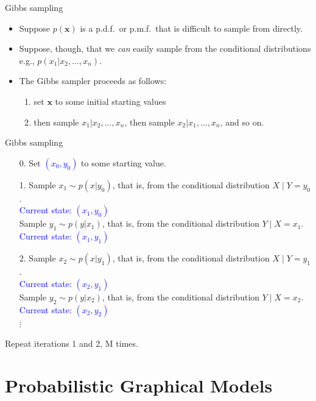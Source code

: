 \documentclass{beamer}					%
\begin{document}
\begin{frame}{Gibbs sampling}

\begin{itemize}
\item Suppose $p(\mathbf{x})$ is a p.d.f.\ or p.m.f.\ that is difficult to sample from directly.  
\item Suppose, though, that we \textit{can} easily sample from the conditional distributions e.g., $p(x_{1}|x_{2},...,x_{n})$. 
\item  The Gibbs sampler proceeds as follows: 
\begin{enumerate}
\item set $\mathbf{x}$ to some initial starting values
\item then sample $x_{1}|x_{2},...,x_{n}$, then sample $x_{2}|x_{1},...,x_{n}$, and so on.
\end{enumerate}
\end{itemize}
\end{frame}

\begin{frame}{Gibbs sampling}
\begin{enumerate}
\item[0.] Set \textcolor{blue}{$(x_0,y_0)$} to some starting value.
\item[1.] Sample $x_1\sim p(x|y_0)$, that is, from the conditional distribution $X\mid Y=y_0$. \\
\textcolor{blue}{Current state: $(x_1, y_0)$}\\
          Sample $y_1\sim p(y|x_1)$, that is, from the conditional distribution $Y\mid X=x_1$.\\
    \textcolor{blue}{      Current state: $(x_1, y_1)$}\\
\item[2.] Sample $x_2\sim p(x|y_1)$, that is, from the conditional distribution $X\mid Y=y_1$. \\
    \textcolor{blue}{      Current state: $(x_2, y_1)$}\\
          Sample $y_2\sim p(y|x_2)$, that is, from the conditional distribution $Y\mid X=x_2$. \\
            \textcolor{blue}{      Current state: $(x_2, y_2)$}\\
        $\vdots$
\end{enumerate}
Repeat iterations 1 and 2, M times. 
\end{frame}

\section{Probabilistic Graphical Models}
\end{document}
